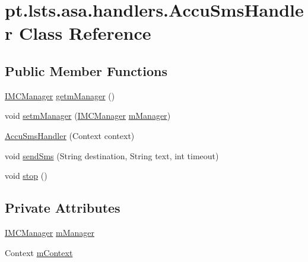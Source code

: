\hypertarget{classpt_1_1lsts_1_1asa_1_1handlers_1_1AccuSmsHandler}{}\section{pt.\+lsts.\+asa.\+handlers.\+Accu\+Sms\+Handler Class Reference}
\label{classpt_1_1lsts_1_1asa_1_1handlers_1_1AccuSmsHandler}
\subsection*{Public Member Functions}
\begin{DoxyCompactItemize}
\item 
\hyperlink{classpt_1_1lsts_1_1asa_1_1managers_1_1IMCManager}{I\+M\+C\+Manager} \hyperlink{classpt_1_1lsts_1_1asa_1_1handlers_1_1AccuSmsHandler_a8bc52ebd1474ceb7bfd40a9a1560495c}{getm\+Manager} ()
\item 
void \hyperlink{classpt_1_1lsts_1_1asa_1_1handlers_1_1AccuSmsHandler_a5cbee7e3a182381c959e24e9088cf830}{setm\+Manager} (\hyperlink{classpt_1_1lsts_1_1asa_1_1managers_1_1IMCManager}{I\+M\+C\+Manager} \hyperlink{classpt_1_1lsts_1_1asa_1_1handlers_1_1AccuSmsHandler_a53314d73ca49397901ad83dc26890767}{m\+Manager})
\item 
\hyperlink{classpt_1_1lsts_1_1asa_1_1handlers_1_1AccuSmsHandler_a73cc38ed0cf13673a2a34b35a6311b32}{Accu\+Sms\+Handler} (Context context)
\item 
void \hyperlink{classpt_1_1lsts_1_1asa_1_1handlers_1_1AccuSmsHandler_a80652aee99a9f6ed3af1273d18ace884}{send\+Sms} (String destination, String text, int timeout)
\item 
void \hyperlink{classpt_1_1lsts_1_1asa_1_1handlers_1_1AccuSmsHandler_ac3464a4db0b2174a65d3ffbe01661dda}{stop} ()
\end{DoxyCompactItemize}
\subsection*{Private Attributes}
\begin{DoxyCompactItemize}
\item 
\hyperlink{classpt_1_1lsts_1_1asa_1_1managers_1_1IMCManager}{I\+M\+C\+Manager} \hyperlink{classpt_1_1lsts_1_1asa_1_1handlers_1_1AccuSmsHandler_a53314d73ca49397901ad83dc26890767}{m\+Manager}
\item 
Context \hyperlink{classpt_1_1lsts_1_1asa_1_1handlers_1_1AccuSmsHandler_a569ffff7311591c5c7081850872c01b6}{m\+Context}
\end{DoxyCompactItemize}


